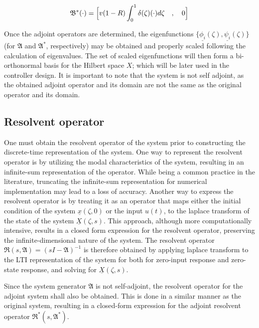 \begin{equation} \label{eq:adjoint_B}
    \mathfrak{B}^* (\cdot) = \Bigl[ v(1-R) \int_0^1 \delta(\zeta) (\cdot) d\zeta \quad , \quad 0 \Bigr]
\end{equation}

Once the adjoint operators are determined, the eigenfunctions $\{ \underline{\phi_i}(\zeta), \underline{\psi_i}(\zeta) \}$ (for $\mathfrak{A}$ and $\mathfrak{A}^*$, respectively) may be obtained and properly scaled following the calculation of eigenvalues. The set of scaled eigenfunctions will then form a bi-orthonormal basis for the Hilbert space $X$; which will be later used in the controller design. It is important to note that the system is not self adjoint, as the obtained adjoint operator and its domain are not the same as the original operator and its domain.

\subsection{Resolvent operator}

One must obtain the resolvent operator of the system prior to constructing the discrete-time representation of the system. One way to represent the resolvent operator is by utilizing the modal characteristics of the system, resulting in an infinite-sum representation of the operator. While being a common practice in the literature, truncating the infinite-sum representation for numerical implementation may lead to a loss of accuracy. Another way to express the resolvent operator is by treating it as an operator that maps either the initial condition of the system $\underline{x}(\zeta,0)$ or the input $u(t)$, to the laplace transform of the state of the system $\underline{X}(\zeta, s)$. This approach, although more computationally intensive, results in a closed form expression for the resolvent operator, preserving the infinite-dimensional nature of the system. The resolvent operator $\mathfrak{R}(s, \mathfrak{A}) = (sI-\mathfrak{A})^{-1}$ is therefore obtained by applying laplace transform to the LTI representation of the system for both for zero-input response and zero-state response, and solving for $\underline{X}(\zeta, s)$.

Since the system generator $\mathfrak{A}$ is not self-adjoint, the resolvent operator for the adjoint system shall also be obtained. This is done in a similar manner as the original system, resulting in a closed-form expression for the adjoint resolvent operator $\mathfrak{R}^*(s, \mathfrak{A}^*)$.

